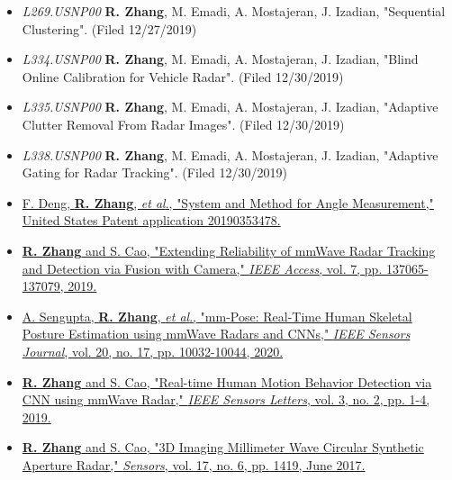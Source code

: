 \documentclass[10pt,letter,ragged2e,withhyper]{leozhang}
\newcommand{\etal}{\textit{et al}.}
\begin{document}


\begin{itemize}
  \item {\it L269.USNP00}	{\bf R. Zhang}, M. Emadi, A. Mostajeran, J. Izadian, "Sequential Clustering". (Filed 12/27/2019)
  \item {\it L334.USNP00} {\bf R. Zhang}, M. Emadi, A. Mostajeran, J. Izadian, "Blind Online Calibration for Vehicle Radar". (Filed	12/30/2019)
  \item {\it L335.USNP00} {\bf R. Zhang}, M. Emadi, A. Mostajeran, J. Izadian, "Adaptive Clutter Removal From Radar Images". (Filed	12/30/2019)
  \item {\it L338.USNP00} {\bf R. Zhang}, M. Emadi, A. Mostajeran, J. Izadian, "Adaptive Gating for Radar Tracking". (Filed	12/30/2019)
  \item \href{https://patents.justia.com/patent/20190353478}{F. Deng, {\bf R. Zhang}, \etal{}, "System and Method for Angle Measurement,"	United States Patent application 20190353478.}
\end{itemize}
\divider


\begin{itemize}
  \item \href{https://ieeexplore.ieee.org/document/8844649}{{\bf R. Zhang} and S. Cao, "Extending Reliability of mmWave Radar Tracking and Detection via Fusion with Camera," {\it IEEE Access}, vol. 7, pp. 137065-137079, 2019.}
  \item \href{https://ieeexplore.ieee.org/document/9083948}{A. Sengupta, {\bf R. Zhang}, \etal{}, "mm-Pose: Real-Time Human Skeletal Posture Estimation using mmWave Radars and CNNs," {\it IEEE Sensors Journal}, vol. 20, no. 17, pp. 10032-10044, 2020.}
  \item \href{https://ieeexplore.ieee.org/document/8585077}{{\bf R. Zhang} and S. Cao, "Real-time Human Motion Behavior Detection via CNN using mmWave Radar," {\it IEEE Sensors Letters}, vol. 3, no. 2, pp. 1-4, 2019.}
  \item \href{http://www.mdpi.com/1424-8220/17/6/1419}{{\bf R. Zhang} and S. Cao, "3D Imaging Millimeter Wave Circular Synthetic Aperture Radar," {\it Sensors}, vol. 17, no. 6, pp. 1419, June 2017.}
\end{itemize}
\divider
\end{document}
